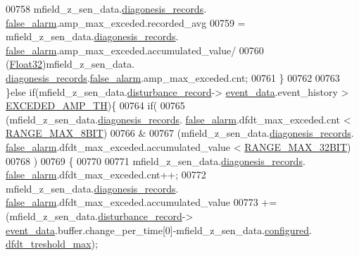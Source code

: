 \begin{DoxyCode}
00758                      mfield\_z\_sen\_data.\hyperlink{a00027_a2bd79ce84bbd6b7f50d38954f7ae475e}{diagonesis\_records}.
      \hyperlink{a00019_a55109284fe950025b5d9f3dde60d4553}{false\_alarm}.amp\_max\_exceded.recorded\_avg
00759                      = mfield\_z\_sen\_data.\hyperlink{a00027_a2bd79ce84bbd6b7f50d38954f7ae475e}{diagonesis\_records}.
      \hyperlink{a00019_a55109284fe950025b5d9f3dde60d4553}{false\_alarm}.amp\_max\_exceded.accumulated\_value/
00760                              (\hyperlink{a00072_a87d38f886e617ced2698fc55afa07637}{Float32})mfield\_z\_sen\_data.
      \hyperlink{a00027_a2bd79ce84bbd6b7f50d38954f7ae475e}{diagonesis\_records}.\hyperlink{a00019_a55109284fe950025b5d9f3dde60d4553}{false\_alarm}.amp\_max\_exceded.cnt;
00761               \}
00762 
00763              \}\textcolor{keywordflow}{else} \textcolor{keywordflow}{if}(mfield\_z\_sen\_data.\hyperlink{a00027_ac9b38e2c1d3f1013a88d33506c754152}{disturbance\_record}->
      \hyperlink{a00028_a8c0bda69e71ef674e60da47ad0be9ab0}{event\_data}.event\_history > \hyperlink{a00019_a9c5372190518a7d696da393f1a9a5fb9}{EXCEDED\_AMP\_TH})\{
00764              \textcolor{keywordflow}{if}(
00765                 (mfield\_z\_sen\_data.\hyperlink{a00027_a2bd79ce84bbd6b7f50d38954f7ae475e}{diagonesis\_records}.
      \hyperlink{a00019_a55109284fe950025b5d9f3dde60d4553}{false\_alarm}.dfdt\_max\_exceded.cnt < \hyperlink{a00021_ae0c75a1cb44e5d3f00ec7c9e40acfda8}{RANGE\_MAX\_8BIT})
00766                 &
00767                 (mfield\_z\_sen\_data.\hyperlink{a00027_a2bd79ce84bbd6b7f50d38954f7ae475e}{diagonesis\_records}.
      \hyperlink{a00019_a55109284fe950025b5d9f3dde60d4553}{false\_alarm}.dfdt\_max\_exceded.accumulated\_value < \hyperlink{a00021_a334bd006b6d2b397dbfc620d62c3c35c}{RANGE\_MAX\_32BIT})
00768                )
00769              \{
00770 
00771                  mfield\_z\_sen\_data.\hyperlink{a00027_a2bd79ce84bbd6b7f50d38954f7ae475e}{diagonesis\_records}.
      \hyperlink{a00019_a55109284fe950025b5d9f3dde60d4553}{false\_alarm}.dfdt\_max\_exceded.cnt++;
00772                  mfield\_z\_sen\_data.\hyperlink{a00027_a2bd79ce84bbd6b7f50d38954f7ae475e}{diagonesis\_records}.
      \hyperlink{a00019_a55109284fe950025b5d9f3dde60d4553}{false\_alarm}.dfdt\_max\_exceded.accumulated\_value
00773                  +=(mfield\_z\_sen\_data.\hyperlink{a00027_ac9b38e2c1d3f1013a88d33506c754152}{disturbance\_record}->
      \hyperlink{a00028_a8c0bda69e71ef674e60da47ad0be9ab0}{event\_data}.buffer.change\_per\_time[0]-mfield\_z\_sen\_data.\hyperlink{a00027_a94b2d1f6ea4ab334c74d24984dd27843}{configured}.
      \hyperlink{a00021_adf9a37828e447378b1d533185213316d}{dfdt\_treshold\_max});

\end{DoxyCode}
